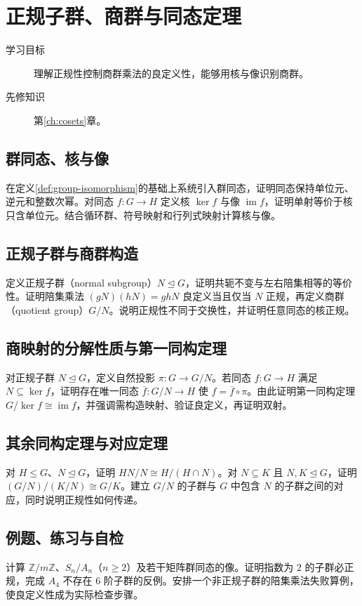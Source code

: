 \setcounter{chapter}{4} %
\chapter{正规子群、商群与同态定理}\label{ch:quotient-groups}

\begin{description}
  \item[学习目标] 理解正规性控制商群乘法的良定义性，能够用核与像识别商群。
  \item[先修知识] 第\ref{ch:cosets}章。
\end{description}

\section{群同态、核与像}
在定义\ref{def:group-isomorphism}的基础上系统引入群同态，证明同态保持单位元、逆元和整数次幂。对同态 $f:G\to H$ 定义核 $\ker f$ 与像 $\operatorname{im}f$，证明单射等价于核只含单位元。结合循环群、符号映射和行列式映射计算核与像。

\section{正规子群与商群构造}
定义正规子群（normal subgroup）$N\trianglelefteq G$，证明共轭不变与左右陪集相等的等价性。证明陪集乘法 $(gN)(hN)=ghN$ 良定义当且仅当 $N$ 正规，再定义商群（quotient group）$G/N$。说明正规性不同于交换性，并证明任意同态的核正规。

\section{商映射的分解性质与第一同构定理}
对正规子群 $N\trianglelefteq G$，定义自然投影 $\pi:G\to G/N$。若同态 $f:G\to H$ 满足 $N\subseteq\ker f$，证明存在唯一同态 $\overline f:G/N\to H$ 使 $f=\overline f\circ\pi$。由此证明第一同构定理 $G/\ker f\cong\operatorname{im}f$，并强调需构造映射、验证良定义，再证明双射。

\section{其余同构定理与对应定理}
对 $H\leq G$、$N\trianglelefteq G$，证明 $HN/N\cong H/(H\cap N)$。对 $N\subseteq K$ 且 $N,K\trianglelefteq G$，证明 $(G/N)/(K/N)\cong G/K$。建立 $G/N$ 的子群与 $G$ 中包含 $N$ 的子群之间的对应，同时说明正规性如何传递。

\section{例题、练习与自检}
计算 $\mathbb Z/m\mathbb Z$、$S_n/A_n$（$n\geq2$）及若干矩阵群同态的像。证明指数为 $2$ 的子群必正规，完成 $A_4$ 不存在 $6$ 阶子群的反例。安排一个非正规子群的陪集乘法失败算例，使良定义性成为实际检查步骤。

